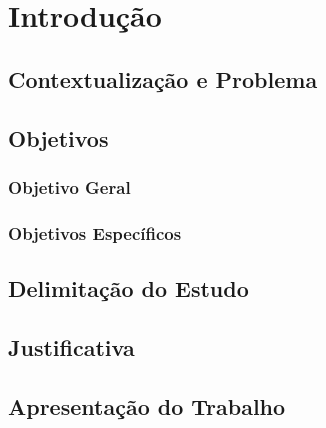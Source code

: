 

\markright{}            %
\pagestyle{headings}    %
\newpage                %

\chapter{Introdução}
\label{cha:intro}

\section{Contextualização e Problema}
\label{subsec:contextualizacao-problema}

\section{Objetivos}
\label{sec:objetivos}

\subsection{Objetivo Geral}
\label{subsec:objetivo-geral}

\subsection{Objetivos Específicos}
\label{subsec:objetivos-especificos}

\section{Delimitação do Estudo}
\label{sec:delimitacao-estudo}

\section{Justificativa}
\label{sec:justificativa}

\section{Apresentação do Trabalho}
\label{sec:apresentacao-trabalho}


